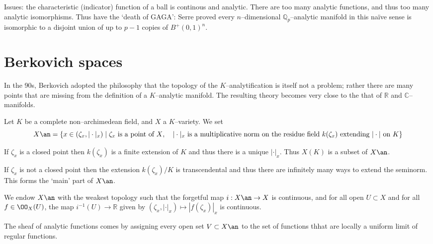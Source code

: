 Issues: the characteristic (indicator) function of a ball is continous and
analytic. There are too many analytic functions, and thus too many analytic
isomorphisms. Thus have the `death of GAGA': Serre proved every
\(n\)--dimensional \(\mathbb{Q}_p\)--analytic manifold in this na\"ive sense is
isomorphic to a disjoint union of up to \(p-1\) copies of \(B^+(0,1)^n\).

\section{Berkovich spaces}
In the 90s, Berkovich adopted the philosophy that the topology of the
\(K\)--analytification is itself not a problem; rather there are many points
that are missing from the definition of a \(K\)--analytic manifold. The
resulting theory becomes very close to the that of \(\mathbb{R}\) and
\(\mathbb{C}\)--manifolds.

\begin{definition}
    Let \(K\) be a complete non--archimedean field, and \(X\) a \(K\)--variety.
    We set \[X\an=\{x\in (\zeta_x, |\cdot|_x)\;|\; \zeta_x \text{ is a point of
    \(X\)}, \quad |\cdot|_x \text{ is a multiplicative norm on the residue
    field \(k(\zeta_x)\) extending \(|\cdot|\) on \(K\)}\}\]
\end{definition}

\begin{remark}
If \(\zeta_x\) is a closed point then \(k(\zeta_x)\) is a finite extension of
\(K\) and thus there is a unique \(|\cdot|_x\). Thus \(X(K)\) is a subset of
\(X\an\).

If \(\zeta_x\) is not a closed point then the extension \(k(\zeta_x)/K\) is
transcendental and thus there are infinitely many ways to extend the seminorm.
This forms the `main' part of \(X\an\).
\end{remark}

We endow \(X\an\) with the weakest topology such that the forgetful map \(i:X\an
\to X\) is continuous, and for all open \(U\subset X\) and for all \(f\in
\OO_X(U)\), the map \(i^{-1}(U)\to \mathbb{R}\) given by
\((\zeta_x,|\cdot|_x)\mapsto |f(\zeta_x)|_x\) is continuous.

The sheaf of analytic functions comes by assigning every open set \(V\subset
X\an\) to the set of functions thhat are locally a uniform limit of regular
functions.

